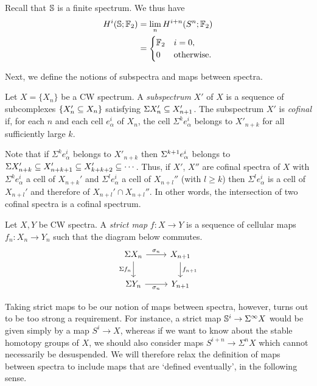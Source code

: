 \documentclass{MetricNotes2023}
\def\bb{\ensuremath\mathbb}
\def\subq{\ensuremath\subseteq}
\def\SIgma{\ensuremath\Sigma}
\begin{document}
\begin{example}
Recall that \(\bb{S}\) is a finite spectrum. We thus have
\begin{align*}
H^i(\bb{S}; \bb{F}_2)&=\lim_nH^{i+n}(S^n; \bb{F}_2)\\
&=\begin{cases}
\bb{F}_2 & i = 0,\\
0 & \text{otherwise.}
\end{cases}
\end{align*}
\end{example}

Next, we define the notions of subspectra and maps between spectra.

\begin{definition}
Let \(X=\{X_n\}\) be a CW spectrum. A \textit{subspectrum} \(X'\) of \(X\) is a sequence of subcomplexes \(\{X_n'\subq X_n\}\) satisfying \(\Sigma X_n'\subq X_{n+1}'\). The subspectrum \(X'\) is \textit{cofinal} if, for each \(n\) and each cell \(e^i_\alpha\) of \(X_n\), the cell \(\Sigma^k e_\alpha^i\) belongs to \(X'_{n+k}\) for all sufficiently large \(k\).
\end{definition}

Note that if \(\Sigma^ke^i_\alpha\) belongs to \(X'_{n+k}\) then \(\SIgma^{k+1}e^i_\alpha\) belongs to \(\Sigma X'_{n+k}\subq X'_{n+k+1}\subq X'_{k+k+2}\subq \cdots\). Thus, if \(X'\), \(X''\) are cofinal spectra of \(X\) with \(\Sigma^k e_{\alpha}^i\) a cell of \(X_{n+k}'\) and \(\Sigma^l e_\alpha^i\) a cell of \(X_{n+l}''\) (with \(l\geq k\)) then \(\Sigma^l e_\alpha^i\) is a cell of \(X_{n+l}'\) and therefore of \(X_{n+l}'\cap X_{n+l}''\). In other words, the intersection of two cofinal spectra is a cofinal spectrum.

\begin{definition}
Let \(X, Y\) be CW spectra. A \textit{strict map} \(f : X \to Y\) is a sequence of cellular maps \(f_n : X_n \to Y_n\) such that the diagram below commutes.
\[\begin{tikzcd}
\Sigma X_n \arrow[r, "\sigma_n"] \arrow[d, swap, "\Sigma f_n"]  & X_{n+1} \arrow[d, "f_{n+1}"]  \\
\SIgma Y_n \arrow[r, swap, "\sigma_n"]  & Y_{n+1}
\end{tikzcd}\]
\end{definition}

Taking strict maps to be our notion of maps between spectra, however, turns out to be too strong a requirement. For instance, a strict map \(\bb{S}^i \to \Sigma^\infty X\) would be given simply by a map \(S^i \to X\), whereas if we want to know about the stable homotopy groups of \(X\), we should also consider maps \(S^{i+n}\to \Sigma^n X\) which cannot necessarily be desuspended. We will therefore relax the definition of maps between spectra to include maps that are `defined eventually', in the following sense. 
\end{document}
